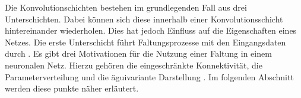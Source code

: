 	
		Die Konvolutionschichten bestehen im grundlegenden Fall aus drei Unterschichten. Dabei können sich diese innerhalb einer Konvolutionsschicht hintereinander wiederholen. Dies hat jedoch Einfluss auf die Eigenschaften eines Netzes. Die erste Unterschicht führt Faltungsprozesse mit den Eingangsdaten durch \cite{deeplearning}. Es gibt drei Motivationen für die Nutzung einer Faltung in einem neuronalen Netz. Hierzu gehören die eingeschränkte Konnektivität, die Parameterverteilung und die äguivariante Darstellung \cite{deeplearning}. Im folgenden Abschnitt werden diese punkte näher erläutert.\\
		
